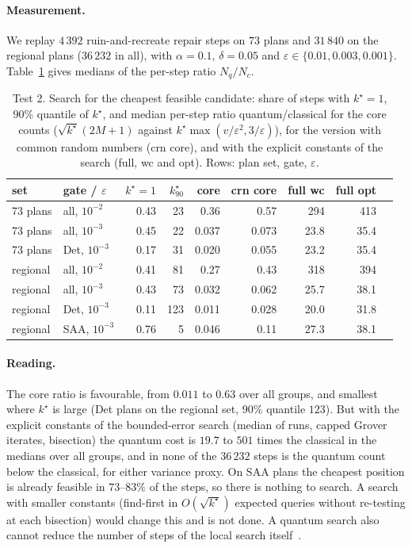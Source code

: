\documentclass[pdflatex,sn-mathphys-num]{sn-jnl}
\theoremstyle{thmstyleone}
\theoremstyle{thmstyletwo}
\begin{document}
\paragraph{Measurement.} We replay $4\,392$ ruin-and-recreate repair steps on $73$ plans and $31\,840$ on the regional plans ($36\,232$ in all), with $\alpha=0.1$, $\delta=0.05$ and $\varepsilon\in\{0.01,0.003,0.001\}$. Table~\ref{tab:search} gives medians of the per-step ratio $N_q/N_c$.

\begin{table}[t]
\caption{Test 2. Search for the cheapest feasible candidate: share of steps with $k^\star=1$, $90\%$ quantile of $k^\star$, and median per-step ratio quantum/classical for the core counts ($\sqrt{k^\star}(2M+1)$ against $k^\star\max(v/\varepsilon^2,3/\varepsilon)$), for the version with common random numbers (crn core), and with the explicit constants of the search (full, wc and opt). Rows: plan set, gate, $\varepsilon$.}\label{tab:search}
\begin{tabular}{@{}llrrrrrrr@{}}
\toprule
set & gate / $\varepsilon$ & $k^\star{=}1$ & $k^\star_{90}$ & core & crn core & full wc & full opt \\
\midrule
73 plans & all, $10^{-2}$ & 0.43 & 23 & 0.36 & 0.57 & 294 & 413 \\
73 plans & all, $10^{-3}$ & 0.45 & 22 & 0.037 & 0.073 & 23.8 & 35.4 \\
73 plans & Det, $10^{-3}$ & 0.17 & 31 & 0.020 & 0.055 & 23.2 & 35.4 \\
regional & all, $10^{-2}$ & 0.41 & 81 & 0.27 & 0.43 & 318 & 394 \\
regional & all, $10^{-3}$ & 0.43 & 73 & 0.032 & 0.062 & 25.7 & 38.1 \\
regional & Det, $10^{-3}$ & 0.11 & 123 & 0.011 & 0.028 & 20.0 & 31.8 \\
regional & SAA, $10^{-3}$ & 0.76 & 5 & 0.046 & 0.11 & 27.3 & 38.1 \\
\bottomrule
\end{tabular}
\end{table}

\paragraph{Reading.} The core ratio is favourable, from $0.011$ to $0.63$ over all groups, and smallest where $k^\star$ is large (Det plans on the regional set, $90\%$ quantile $123$). But with the explicit constants of the bounded-error search (median of runs, capped Grover iterates, bisection) the quantum cost is $19.7$ to $501$ times the classical in the medians over all groups, and in none of the $36\,232$ steps is the quantum count below the classical, for either variance proxy. On SAA plans the cheapest position is already feasible in $73$--$83\%$ of the steps, so there is nothing to search. A search with smaller constants (find-first in $O(\sqrt{k^\star})$ expected queries without re-testing at each bisection) would change this and is not done. A quantum search also cannot reduce the number of steps of the local search itself~\cite{Aaronson2006}.
\end{document}
